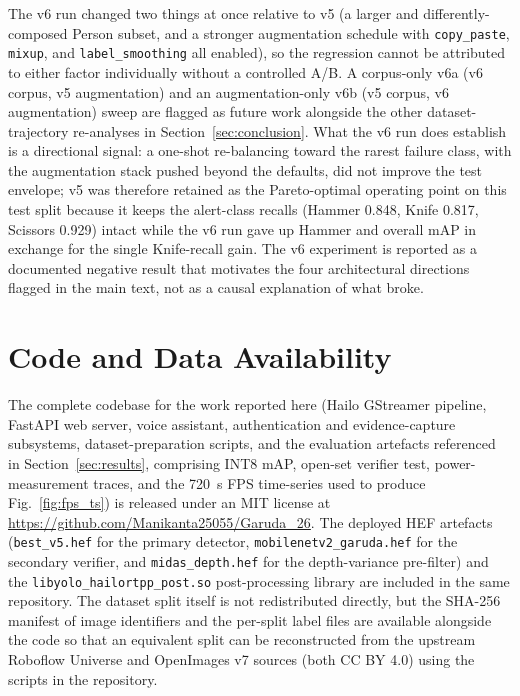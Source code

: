 \documentclass{ieeeaccess}
\begin{document}
The v6 run changed two things at once relative to v5 (a larger and differently-composed Person subset, and a stronger augmentation schedule with \texttt{copy\_paste}, \texttt{mixup}, and \texttt{label\_smoothing} all enabled), so the regression cannot be attributed to either factor individually without a controlled A/B. A corpus-only v6a (v6 corpus, v5 augmentation) and an augmentation-only v6b (v5 corpus, v6 augmentation) sweep are flagged as future work alongside the other dataset-trajectory re-analyses in Section~\ref{sec:conclusion}. What the v6 run does establish is a directional signal: a one-shot re-balancing toward the rarest failure class, with the augmentation stack pushed beyond the defaults, did not improve the test envelope; v5 was therefore retained as the Pareto-optimal operating point on this test split because it keeps the alert-class recalls (Hammer 0.848, Knife 0.817, Scissors 0.929) intact while the v6 run gave up Hammer and overall mAP in exchange for the single Knife-recall gain. The v6 experiment is reported as a documented negative result that motivates the four architectural directions flagged in the main text, not as a causal explanation of what broke.




\section*{Code and Data Availability}
\label{sec:code_data}
The complete codebase for the work reported here (Hailo GStreamer pipeline, FastAPI web server, voice assistant, authentication and evidence-capture subsystems, dataset-preparation scripts, and the evaluation artefacts referenced in Section~\ref{sec:results}, comprising INT8 mAP, open-set verifier test, power-measurement traces, and the 720~s FPS time-series used to produce Fig.~\ref{fig:fps_ts}) is released under an MIT license at \url{https://github.com/Manikanta25055/Garuda_26}. The deployed HEF artefacts (\texttt{best\_v5.hef} for the primary detector, \texttt{mobilenetv2\_garuda.hef} for the secondary verifier, and \texttt{midas\_depth.hef} for the depth-variance pre-filter) and the \texttt{libyolo\_hailortpp\_post.so} post-processing library are included in the same repository. The dataset split itself is not redistributed directly, but the SHA-256 manifest of image identifiers and the per-split label files are available alongside the code so that an equivalent split can be reconstructed from the upstream Roboflow Universe and OpenImages v7 sources (both CC BY 4.0) using the scripts in the repository.
\end{document}
